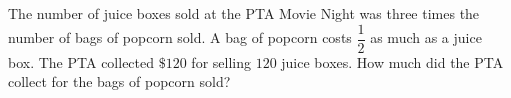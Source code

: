 The number of juice boxes sold at the PTA Movie Night was three times the number of bags of popcorn sold. A bag of popcorn costs $\dfrac{1}{2}$ as much as a juice box. The PTA collected $\$120$ for selling $120$ juice boxes. How much did the PTA collect for the bags of popcorn sold?
